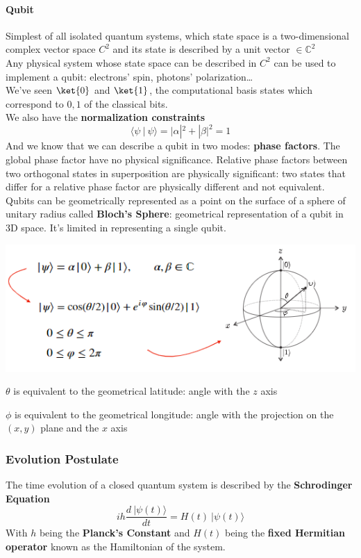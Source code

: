 \documentclass[10pt]{report}
\begin{document}
\paragraph{Qubit} Simplest of all isolated quantum systems, which state space is a two-dimensional complex vector space $C^2$ and its state is described by a unit vector $\in \mathbb{C}^2$\\
Any physical system whose state space can be described in $C^2$ can be used to implement a qubit: electrons' spin, photons' polarization\ldots\\
We've seen $\ket{0}$ and $\ket{1}$, the computational basis states which correspond to $0,1$ of the classical bits.\\
We also have the \textbf{normalization constraints} $$\langle\psi\:|\:\psi\rangle = |\alpha|^2+|\beta|^2 = 1$$
And we know that we can describe a qubit in two modes: \textbf{phase factors}. The global phase factor have no physical significance. Relative phase factors between two orthogonal states in superposition are physically significant: two states that differ for a relative phase factor are physically different and not equivalent.\\
Qubits can be geometrically represented as a point on the surface of a sphere of unitary radius called \textbf{Bloch's Sphere}: geometrical representation of a qubit in 3D space. It's limited in representing a single qubit.
\begin{center}
	\includegraphics[scale=0.75]{13.png}
\end{center}
\begin{list}{}{}
	\item $\theta$ is equivalent to the geometrical latitude: angle with the $z$ axis
	\item $\phi$ is equivalent to the geometrical longitude: angle with the projection on the $(x,y)$ plane and the $x$ axis
\end{list}
\subsubsection{Evolution Postulate}
The time evolution of a closed quantum system is described by the \textbf{Schrodinger Equation} $$ih\frac{d\:|\psi(t)\rangle}{dt} = H(t)\:|\psi(t)\rangle$$
With $h$ being the \textbf{Planck's Constant} and $H(t)$ being the \textbf{fixed Hermitian operator} known as the Hamiltonian of the system.
\end{document}
